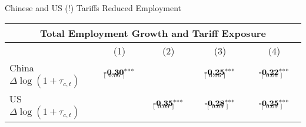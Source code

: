\documentclass[9pt,pdftex,aspectratio=1610]{beamer}
\theoremstyle{definition}
\begin{document}
\begin{frame}[t]{Chinese and US (!) Tariffs Reduced Employment}
\vspace{-0.25cm}
\footnotesize
\begin{table}[t]
\footnotesize
\setlength {\tabcolsep}{.15mm}
\renewcommand{\arraystretch}{1.5}
\begin{center}
\begin{tabular}{l c c c c}
\multicolumn{5}{c}{\small \textbf{Total Employment Growth and Tariff Exposure}}\\
\hline
\hline
& (1) & (2) &  (3)  & (4)   \\
\cmidrule(lr){2-5}
China $\Delta \log (1 + \tau_{c,t})$
&  $\begin{array}{c}\textbf{-0.30}^{***}  \vspace{-.32cm}\\ \scriptstyle [ \ 0.06 \ ]\phantom{^{***}}\end{array}$
&
&  $\begin{array}{c}\textbf{-0.25}^{***}  \vspace{-.32cm}\\ \scriptstyle [ \ 0.06 \ ]\phantom{^{***}}\end{array}$
& $\begin{array}{c}\textbf{-0.22}^{***} \vspace{-.32cm}\\ \scriptstyle \phantom{-}[ \ 0.06 \ ]\phantom{^{***}}\end{array}$
\\

US $\Delta \log (1 + \tau_{c,t})$
&
& $\begin{array}{c}\textbf{-0.35}^{***}  \vspace{-.32cm}\\ \scriptstyle [ \ 0.09 \ ]\phantom{^{***}}\end{array}$
&  $\begin{array}{c}\textbf{-0.28}^{***} \vspace{-.32cm}\\ \scriptstyle \phantom{-}[ \ 0.09 \ ]\phantom{^{***}}\end{array}$
& $\begin{array}{c}\textbf{-0.25}^{***} \vspace{-.32cm}\\ \scriptstyle \phantom{-}[ \ 0.09 \ ]\phantom{^{***}}\end{array}$
\\


\end{tabular}
\end{center}
\end{table}
\end{frame}
\end{document}
